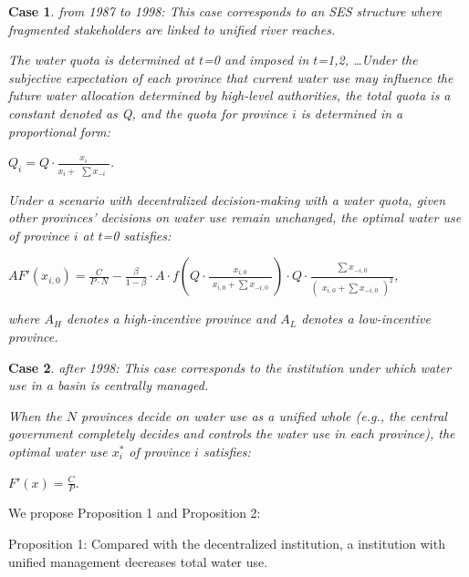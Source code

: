 \documentclass[preprint, 12pt]{elsarticle}
\newtheorem{case}{Case}
\begin{document}
 \begin{case} from 1987 to 1998: This case corresponds to an SES structure where fragmented stakeholders are linked to unified river reaches.

 The water quota is determined at $t$=0 and imposed in $t$=1,2, \ldots Under the subjective expectation of each province that current water use may influence the future water allocation determined by high-level authorities, the total quota is a constant denoted as Q, and the quota for province $i$ is determined in a proportional form:

 $Q_i=Q \cdot \frac{x_i}{x_i + \begin{matrix}\sum{x_{-i}} \end{matrix}}$.

Under a scenario with decentralized decision-making with a water quota, given other provinces' decisions on water use remain unchanged, the optimal water use of province $i$ at $t$=0 satisfies:

$AF'(x_{i,0})=\frac{C}{P \cdot N} - \frac{\beta}{1-\beta} \cdot A \cdot f(Q \cdot \frac{x_{i,0}}{\begin{matrix} x_{i,0} + \sum x_{-i,0} \end{matrix}}) \cdot Q \cdot \frac{\begin{matrix} \sum x_{-i,0} \end{matrix}}{(\begin{matrix} x_{i,0} + \sum x_{-i,0} \end{matrix})^2}$,

where $A_H$ denotes a high-incentive province and $A_L$ denotes a low-incentive province.

\end{case}

\begin{case} after 1998: This case corresponds to the institution under which water use in a basin is centrally managed.

 When the $N$ provinces decide on water use as a unified whole (e.g., the central government completely decides and controls the water use in each province), the optimal water use $x_i^*$ of province $i$ satisfies:

$F'(x)=\frac{C}{P}$.

\end{case}

We propose Proposition 1 and Proposition 2:

Proposition 1: Compared with the decentralized institution, a institution with unified management decreases total water use.
\end{document}
